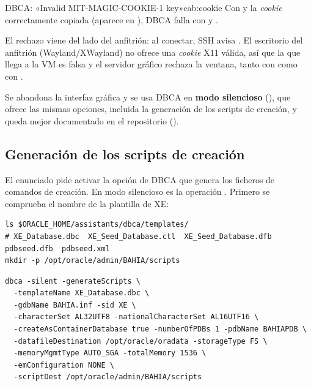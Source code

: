 \begin{cabezazo}{DBCA: «Invalid MIT-MAGIC-COOKIE-1 key»}{cab:cookie}
\problema Con  y la \emph{cookie} correctamente
copiada (aparece en ), DBCA falla con
 y
.

\causa El rechazo viene del lado del anfitrión: al conectar, SSH avisa
. El escritorio del anfitrión (Wayland/XWayland) no ofrece una
\emph{cookie} X11 válida, así que la que llega a la VM es falsa y el servidor
gráfico rechaza la ventana, tanto con  como con .

\solucion Se abandona la interfaz gráfica y se usa DBCA en \textbf{modo
silencioso} (), que ofrece las mismas opciones, incluida la
generación de los scripts de creación, y queda mejor documentado en el
repositorio ().
\end{cabezazo}


\subsection{Generación de los scripts de creación}

El enunciado pide activar la opción de DBCA que genera los ficheros de comandos
de creación. En modo silencioso es la operación . Primero
se comprueba el nombre de la plantilla de XE:

\begin{lstlisting}[style=bash]
ls $ORACLE_HOME/assistants/dbca/templates/
# XE_Database.dbc  XE_Seed_Database.ctl  XE_Seed_Database.dfb  pdbseed.dfb  pdbseed.xml
mkdir -p /opt/oracle/admin/BAHIA/scripts
\end{lstlisting}

\begin{lstlisting}[style=bash]
dbca -silent -generateScripts \
  -templateName XE_Database.dbc \
  -gdbName BAHIA.inf -sid XE \
  -characterSet AL32UTF8 -nationalCharacterSet AL16UTF16 \
  -createAsContainerDatabase true -numberOfPDBs 1 -pdbName BAHIAPDB \
  -datafileDestination /opt/oracle/oradata -storageType FS \
  -memoryMgmtType AUTO_SGA -totalMemory 1536 \
  -emConfiguration NONE \
  -scriptDest /opt/oracle/admin/BAHIA/scripts
\end{lstlisting}

